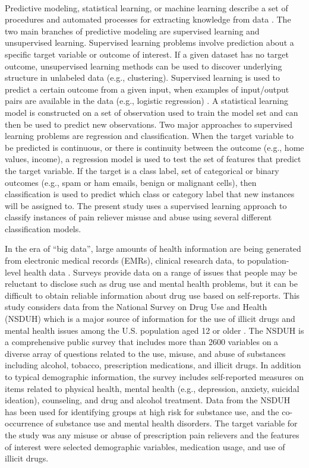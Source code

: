 \\\documentclass[sigconf]{acmart}
\begin{document}
Predictive modeling, statistical learning, or machine learning describe a 
set of procedures and automated processes for extracting knowledge from data 
\cite{james13, kuhn13, muller17, raschka17}. The two main branches of 
predictive modeling are supervised learning and unsupervised learning. 
Supervised learning problems involve prediction about a specific target 
variable or outcome of interest. If a given dataset has no target outcome, 
unsupervised learning methods can be used to discover underlying structure 
in unlabeled data (e.g., clustering). Supervised learning is used to 
predict a certain outcome from a given input, when examples of input/output 
pairs are available in the data (e.g., logistic regression) \cite{muller17}. 
A statistical learning model is constructed on a set of observation used to
train the model set and can then be used to predict new observations. Two major 
approaches to supervised learning problems are regression and classification. 
When the target variable to be predicted is continuous, or there is continuity 
between the outcome (e.g., home values, income), a regression model is used 
to test the set of features that predict the target variable. If the target is 
a class label, set of categorical or binary outcomes (e.g., spam or ham emails, 
benign or malignant cells), then classification is used to predict which class 
or category label that new instances will be assigned to. The present study 
uses a supervised learning approach to classify instances of pain reliever 
misuse and abuse using several different classification models. 


In the era of ``big data'', large amounts of health information are being 
generated from electronic medical records (EMRs), clinical research data, to 
population-level health data \cite{herland14}. Surveys provide data on a range 
of issues that people may be reluctant to disclose such as drug use and mental 
health problems, but it can be difficult to obtain reliable information 
about drug use based on self-reports. This study considers data from the 
National Survey on Drug Use and Health (NSDUH) which is a major source of 
information for the use of illicit drugs and mental health issues among the 
U.S. population aged 12 or older \cite{samhsa18}. The NSDUH is a comprehensive 
public survey that includes more than 2600 variables on a diverse array of 
questions related to the use, misuse, and abuse of substances including 
alcohol, tobacco, prescription medications, and illicit drugs. In addition 
to typical demographic information, the survey includes self-reported 
measures on items related to physical health, mental health (e.g., depression, 
anxiety, suicidal ideation), counseling, and drug and alcohol treatment. 
Data from the NSDUH has been used for identifying groups at high risk for 
substance use, and the co-occurrence of substance use and mental health 
disorders. The target variable for the study was any misuse or abuse of 
prescription pain relievers and the features of interest were selected 
demographic variables,  medication usage, and use of illicit drugs. 
\end{document}

